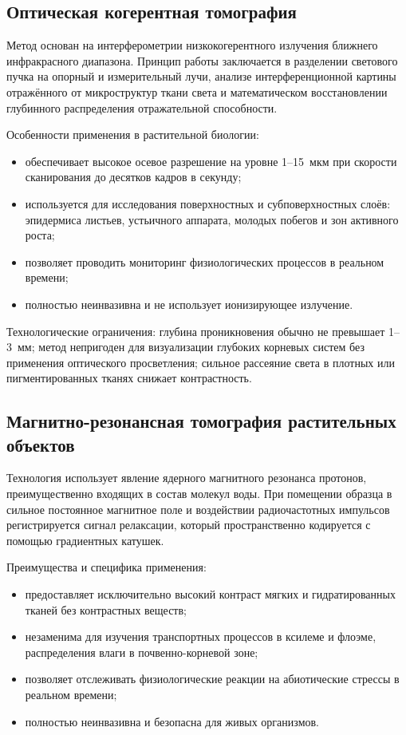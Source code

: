 \documentclass[14pt,a4paper]{extreport}
\begin{document}
\subsection{Оптическая когерентная томография}

Метод основан на интерферометрии низкокогерентного излучения ближнего инфракрасного диапазона. Принцип работы заключается в разделении светового пучка на опорный и измерительный лучи, анализе интерференционной картины отражённого от микроструктур ткани света и математическом восстановлении глубинного распределения отражательной способности.

Особенности применения в растительной биологии:
\begin{itemize}
  \item обеспечивает высокое осевое разрешение на уровне 1--15~мкм при скорости сканирования до десятков кадров в секунду;
  \item используется для исследования поверхностных и субповерхностных слоёв: эпидермиса листьев, устьичного аппарата, молодых побегов и зон активного роста;
  \item позволяет проводить мониторинг физиологических процессов в реальном времени;
  \item полностью неинвазивна и не использует ионизирующее излучение.
\end{itemize}

Технологические ограничения: глубина проникновения обычно не превышает 1--3~мм; метод непригоден для визуализации глубоких корневых систем без применения оптического просветления; сильное рассеяние света в плотных или пигментированных тканях снижает контрастность.

\subsection{Магнитно-резонансная томография растительных объектов}

Технология использует явление ядерного магнитного резонанса протонов, преимущественно входящих в состав молекул воды. При помещении образца в сильное постоянное магнитное поле и воздействии радиочастотных импульсов регистрируется сигнал релаксации, который пространственно кодируется с помощью градиентных катушек.

Преимущества и специфика применения:
\begin{itemize}
  \item предоставляет исключительно высокий контраст мягких и гидратированных тканей без контрастных веществ;
  \item незаменима для изучения транспортных процессов в ксилеме и флоэме, распределения влаги в почвенно-корневой зоне;
  \item позволяет отслеживать физиологические реакции на абиотические стрессы в реальном времени;
  \item полностью неинвазивна и безопасна для живых организмов.
\end{itemize}
\end{document}

